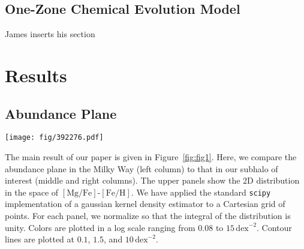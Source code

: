 \documentclass[linenumbers, twocolumn]{aastex631}
\newcommand{\FeH}{\ensuremath{[\textrm{Fe}/\textrm{H}]}}
\newcommand{\MgFe}{\ensuremath{[\textrm{Mg}/\textrm{Fe}]}}
\newcommand{\dex}{\ensuremath{\textrm{dex}}}
\begin{document}
\subsection{One-Zone Chemical Evolution Model}\label{ssec:onezone_met}
James inserts his section

\section{Results}\label{sec:results}
\subsection{Abundance Plane}\label{ssec:plane}

\begin{figure*}
  \centering
  \texttt{[image: fig/392276.pdf]}
  \caption{\textbf{When old stars are $\alpha$-enhanced, our subhalo of interest from TNG displays a prominent bimodality.} The upper left panel shows the distribution in the \MgFe{}-\FeH{} plane of the Milky Way, demonstrating a clear bimodality (data selection given in text). The lower left panel shows the 1D histograms of \MgFe{} at fixed \FeH{} values of $-0.5$, $-0.25$, $0$, and $0.25$ (blue, orange, green, and red, respectively). In the Milky Way, the bimodality is strongest at low metallicities while disappearing at high metallicities. The middle column shows the same plots but for our TNG subhalo of interest (392276) and with the fixed \FeH{} values $0.25\,\dex$ lower. Only faint structure is seen in the lowest bin (blue, $-0.75\,\dex$). The right column shows the same subhalo but after increasing the \MgFe{} value of star particles formed before $z=1.5$ linearly with formation time (specifically by incrementing \MgFe{} by $0.1\times\left(t_{1.5}-t_{\textrm{form}}\right)$ if $t_{\textrm{form}} < t_{1.5}$, where $t_{1.5}$ is the age of the universe at $z=1.5$). A clear bimodality is shown in these panels which, unlike in the Milky Way, is present at all metallicities.}
  \label{fig:fig1}
\end{figure*}

The main result of our paper is given in Figure~\ref{fig:fig1}. Here, we compare the abundance plane in the Milky Way (left column) to that in our subhalo of interest (middle and right columns). The upper panels show the 2D distribution in the space of \MgFe{}-\FeH{}. We have applied the standard \texttt{scipy} implementation of a gaussian kernel density estimator to a Cartesian grid of points. For each panel, we normalize so that the integral of the distribution is unity. Colors are plotted in a log scale ranging from $0.08$ to $15\,\dex^{-2}$. Contour lines are plotted at $0.1$, $1.5$, and $10\,\dex^{-2}$.
\end{document}
